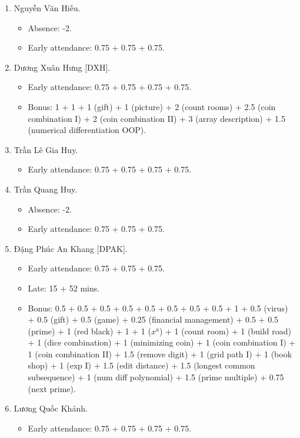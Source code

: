\documentclass{article}
\begin{document}
\begin{enumerate}
\begin{itemize}
	\end{itemize}
	\item {\sc Nguyễn Văn Hiếu.}
	\begin{itemize}
		\item Absence: -2.
		\item Early attendance: 0.75 + 0.75 + 0.75.
	\end{itemize}
	\item {\sc Dương Xuân Hưng [DXH].}
	\begin{itemize}
		\item Early attendance: 0.75 + 0.75 + 0.75 + 0.75.
		\item Bonus: 1 + 1 + 1 (gift) + 1 (picture) + 2 (count rooms) + 2.5 (coin combination I) + 2 (coin combination II) + 3 (array description) + 1.5 (numerical differentiation OOP).
	\end{itemize}
	\item {\sc Trần Lê Gia Huy.}
	\begin{itemize}
		\item Early attendance: 0.75 + 0.75 + 0.75 + 0.75.
	\end{itemize}
	\item {\sc Trần Quang Huy.}
	\begin{itemize}
		\item Absence: -2.
		\item Early attendance: 0.75 + 0.75 + 0.75.
	\end{itemize}
	\item {\sc Đặng Phúc An Khang [DPAK].}
	\begin{itemize}
		\item Early attendance: 0.75 + 0.75 + 0.75.
		\item Late: 15 + 52 mins.
		\item Bonus: 0.5 + 0.5 + 0.5 + 0.5 + 0.5 + 0.5 + 0.5 + 0.5 + 1 + 0.5 (virus) + 0.5 (gift) + 0.5 (game) + 0.25 (financial management) + 0.5 + 0.5 (prime) + 1 (red black) + 1 + 1 ($x^a$) + 1 (count room) + 1 (build road) + 1 (dice combination) + 1 (minimizing coin) + 1 (coin combination I) + 1 (coin combination II) + 1.5 (remove digit) + 1 (grid path I) + 1 (book shop) + 1 (exp I) + 1.5 (edit distance) + 1.5 (longest common subsequence) + 1 (num diff polynomial) + 1.5 (prime multiple) + 0.75 (next prime).
	\end{itemize}
	\item {\sc Lương Quốc Khánh.}
	\begin{itemize}
		\item Early attendance: 0.75 + 0.75 + 0.75 + 0.75.

\end{itemize}
\end{enumerate}
\end{document}
